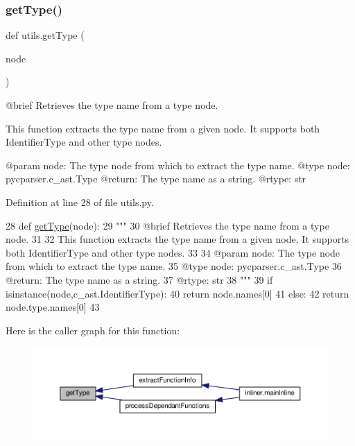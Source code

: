 \subsubsection{\texorpdfstring{get\+Type()}{getType()}}
{\footnotesize\ttfamily def utils.\+get\+Type (\begin{DoxyParamCaption}\item[{}]{node }\end{DoxyParamCaption})}

\begin{DoxyVerb}@brief Retrieves the type name from a type node.

This function extracts the type name from a given node. It supports both IdentifierType and other type nodes.

@param node: The type node from which to extract the type name.
@type node: pycparser.c_ast.Type
@return: The type name as a string.
@rtype: str
\end{DoxyVerb}
 

Definition at line 28 of file utils.\+py.


\begin{DoxyCode}
28 \textcolor{keyword}{def }\hyperlink{namespaceutils_a63a441384eb62bbf51329ab7e1b212a6}{getType}(node):
29     \textcolor{stringliteral}{"""
}
30 \textcolor{stringliteral}{    @brief Retrieves the type name from a type node.
}
31 \textcolor{stringliteral}{
}
32 \textcolor{stringliteral}{    This function extracts the type name from a given node. It supports both IdentifierType and other type
       nodes.
}
33 \textcolor{stringliteral}{
}
34 \textcolor{stringliteral}{    @param node: The type node from which to extract the type name.
}
35 \textcolor{stringliteral}{    @type node: pycparser.c\_ast.Type
}
36 \textcolor{stringliteral}{    @return: The type name as a string.
}
37 \textcolor{stringliteral}{    @rtype: str
}
38 \textcolor{stringliteral}{    """}
39     \textcolor{keywordflow}{if} isinstance(node,c\_ast.IdentifierType):
40         \textcolor{keywordflow}{return} node.names[0]
41     \textcolor{keywordflow}{else}:
42         \textcolor{keywordflow}{return} node.type.names[0]
43 
\end{DoxyCode}
Here is the caller graph for this function\+:\nopagebreak
\begin{figure}[H]
\begin{center}
\leavevmode
\includegraphics[width=350pt]{namespaceutils_a63a441384eb62bbf51329ab7e1b212a6_icgraph}
\end{center}
\end{figure}
\mbox{\label{namespaceutils_a694fa47d55cc41b3f9e86ab2f90e98f3}} 
